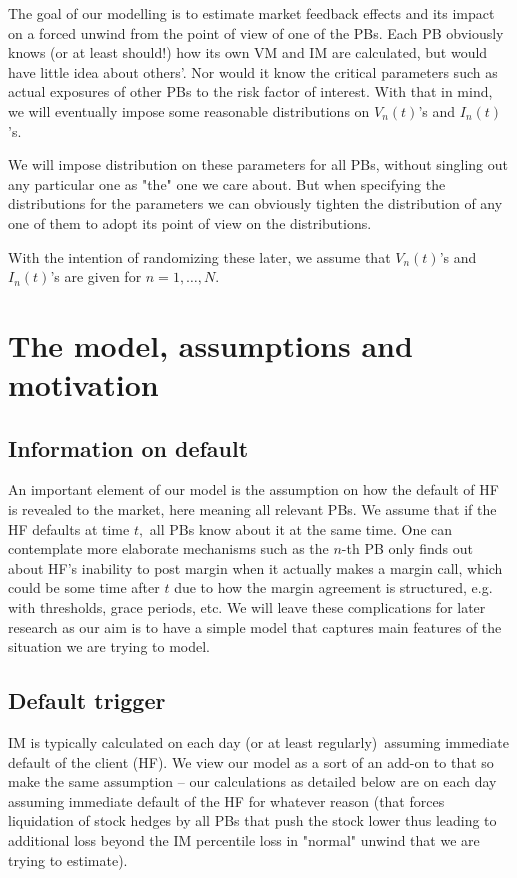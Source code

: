 \documentclass{article}
\begin{document}
The goal of our modelling is to estimate market feedback effects and its
impact on a forced unwind from the point of view of one of the PBs. Each PB
obviously knows (or at least should!) how its own VM and IM are calculated,
but would have little idea about others'. Nor would it know the critical
parameters such as actual exposures of other PBs to the risk factor of
interest. With that in mind, we will eventually impose some reasonable
distributions on $V_{n}(t)$'s and $I_{n}(t)$'s. 

We will impose distribution on these parameters for all PBs, without
singling out any particular one as "the" one we care about. But when
specifying the distributions for the parameters we can obviously tighten the
distribution of any one of them to adopt its point of view on the
distributions.

With the intention of randomizing these later, we assume that $V_{n}(t)$'s
and $I_{n}(t)$'s are given for $n=1,\dots ,N.$

\section{The model, assumptions and motivation}

\subsection{Information on default}

An important element of our model is the assumption on how the default of HF
is revealed to the market, here meaning all relevant PBs. We assume that if
the HF defaults at time $t,$ all PBs know about it at the same time. One can
contemplate more elaborate mechanisms such as the $n$-th PB only finds out
about HF's inability to post margin when it actually makes a margin call,
which could be some time after $t$ due to how the margin agreement is
structured, e.g. with thresholds, grace periods, etc. We will leave these
complications for later research as our aim is to have a simple model that
captures main features of the situation we are trying to model.

\subsection{Default trigger}

IM is typically calculated on each day (or at least regularly)\ assuming
immediate default of the client (HF). We view our model as a sort of an
add-on to that so make the same assumption -- our calculations as detailed
below are on each day assuming immediate default of the HF for whatever
reason (that forces liquidation of stock hedges by all PBs that push the
stock lower thus leading to additional loss beyond the IM percentile loss in
"normal" unwind that we are trying to estimate).
\end{document}
